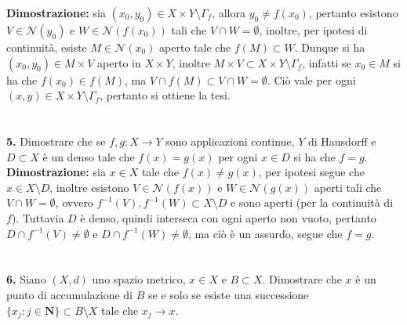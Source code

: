 \documentclass{article}
\begin{document}
\textbf{Dimostrazione:} sia $(x_0, y_0) \in X \times Y \setminus \Gamma_f$, allora $y_0 \neq f(x_0)$, pertanto esistono $V \in \mathcal{N}(y_0)$ e $W \in \mathcal{N}(f(x_0))$ tali che $V \cap W = \emptyset$, inoltre, per ipotesi di continuità, esiste $M \in \mathcal{N}(x_0)$ aperto tale che $f(M) \subset W$. Dunque si ha $(x_0, y_0) \in M \times V$ aperto in $X \times Y$, inoltre $M \times V \subset X \times Y \setminus \Gamma_f$, infatti se $x_0 \in M$ si ha che $f(x_0) \in f(M)$, ma $V \cap f(M) \subset V \cap W = \emptyset$. Ciò vale per ogni $(x, y) \in X \times Y \setminus \Gamma_f$, pertanto si ottiene la tesi. \\ \\ \\
\textbf{5.} Dimostrare che se $f, g : X \longrightarrow Y$ sono applicazioni continue, $Y$ di Hausdorff e $D \subset X$ è un denso tale che $f(x) = g(x)$ per ogni $x \in D$ si ha che $f = g$. \\

\textbf{Dimostrazione:} sia $x \in X$ tale che $f(x) \neq g(x)$, per ipotesi segue che $x \in X \setminus D$, inoltre esistono $V \in \mathcal{N}(f(x))$ e $W \in \mathcal{N}(g(x))$ aperti tali che $V \cap W = \emptyset$, ovvero $f^{-1}(V), f^{-1}(W) \subset X \setminus D$ e sono aperti (per la continuità di $f$). Tuttavia $D$ è denso, quindi interseca con ogni aperto non vuoto, pertanto $D \cap f^{-1}(V) \neq \emptyset$ e $D \cap f^{-1}(W) \neq \emptyset$, ma ciò è un assurdo, segue che $f = g$. \\ \\ \\
\textbf{6.} Siano $(X, d)$ uno spazio metrico, $x \in X$ e $B \subset X$. Dimostrare che $x$ è un punto di accumulazione di $B$ se e solo se esiste una successione $\{x_j : j \in \mathbf{N}\} \subset B\setminus X$ tale che $x_j \rightarrow x$. \\
\end{document}
